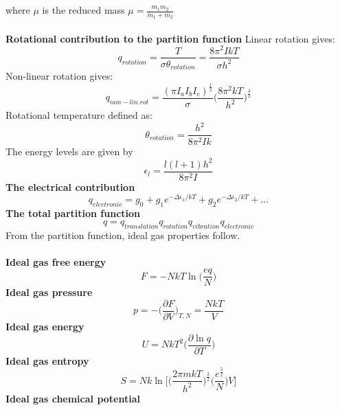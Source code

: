 \documentclass[8pt]{article}
\numberwithin{equation}{section}
\begin{document}
\begin{multicols}{2}
where $\mu$ is the reduced mass $\mu=\frac{m_{1}m_{2}}{m_{1}+m_{2}}$ \\ \\
\textbf{Rotational contribution to the partition function}
Linear rotation gives: 
\begin{equation}
q_{rotation}=\frac{T}{\sigma\theta_{rotation}}=\frac{8\pi^{2}IkT}{\sigma h^{2}} \tag{11.30}
\end{equation}
Non-linear rotation gives: 
\begin{equation}
q_{non-lin.rot}=\frac{(\pi I_{a}I_{b}I_{c})^{\frac{1}{2}}}{\sigma}\bigg(\frac{8\pi^{2}kT}{h^{2}}\bigg)^{\frac{3}{2}} \tag{11.31}
\end{equation}
Rotational temperature defined as: 
\begin{equation}
\theta_{rotation}=\frac{h^{2}}{8\pi^{2}Ik} \tag{-}
\end{equation}
The energy levels are given by
\begin{equation}
\epsilon_{l}=\frac{l(l+1)h^{2}}{8\pi^{2}I} \tag{11.28}
\end{equation}
\textbf{The electrical contribution}
\begin{equation}
q_{electronic}=g_{0}+g_{1}e^{-\Delta\epsilon_{1}/kT}+g_{2}e^{-\Delta\epsilon_{2}/kT}+... \tag{11.33}
\end{equation}
\textbf{The total partition function}
\begin{equation}
q=q_{translation}q_{rotation}q_{vibration}q_{electronic} \tag{11.35}
\end{equation}
From the partition function, ideal gas properties follow. \\\\
\textbf{Ideal gas free energy}
\begin{equation}
F=-NkT\ln{\bigg(\frac{eq}{N}\bigg)} \tag{11.36}
\end{equation}
\textbf{Ideal gas pressure}
\begin{equation}
p=-\bigg(\frac{\partial F}{\partial V}\bigg)_{T,N}=\frac{NkT}{V} \tag{-}
\end{equation}
\textbf{Ideal gas energy}
\begin{equation}
U=NkT^{2}\bigg(\frac{\partial\ln{q}}{\partial T}\bigg) \tag{-}
\end{equation}
\textbf{Ideal gas entropy}
\begin{equation}
S=Nk\ln{\bigg[\bigg(\frac{2\pi mkT}{h^{2}} \bigg)^{\frac{3}{2}}\bigg(\frac{e^{\frac{5}{2}}}{N}   \bigg)V\bigg]} \tag{11.42}
\end{equation}
\textbf{Ideal gas chemical potential}

\end{multicols}
\end{document}
